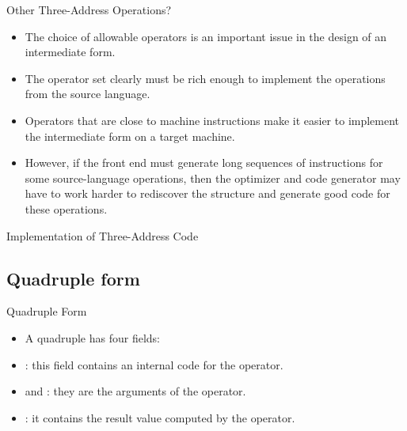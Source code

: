 \begin{bibunit}[apalike]
\begin{frame}{Other Three-Address Operations?}
	\begin{itemize}
	\item The choice of allowable operators is an important issue in the design of an intermediate form.
	\vfill
	\item The operator set clearly must be rich enough to implement  the operations from the source language.
	\vfill
	\item Operators that are close to machine instructions make it easier to implement the intermediate form on a target machine.
	\vfill
	\item However, if the front end must generate long sequences of instructions for some source-language operations, then the optimizer and code generator may have to work harder to rediscover the structure and generate good code for these operations.
	\end{itemize}
\end{frame}

\begin{frame}{Implementation of Three-Address Code}
	\vspace{3em}
\end{frame}

\subsection{Quadruple form}

\tableofcontentslide[sections={1-5},sectionstyle={show/shaded},subsectionstyle={show/shaded/hide},subsubsectionstyle={show/show/hide/hide}]

\begin{frame}{Quadruple Form}
	\begin{itemize}
	\item A quadruple has four fields: 
		\begin{center}
		\end{center}
	\vfill
	\item {}: this field contains an internal code for the operator.
	\item {} and : they are the arguments of the operator.
	\item {}: it contains the result value computed by the operator.
	\end{itemize}
\end{frame}


\end{bibunit}

